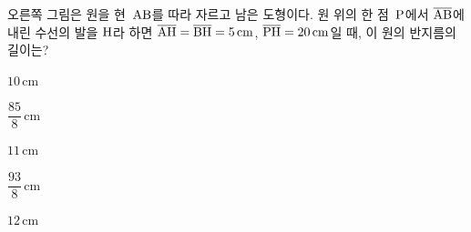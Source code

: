 \noindent\begin{minipage}[t]{0.58\linewidth}\vspace{0pt}\raggedright 오른쪽 그림은 원을 현~$\mathrm{AB}$를 따라 자르고 남은 도형이다. 원 위의 한 점~$\mathrm{P}$에서 $\overline{\mathrm{AB}}$에 내린 수선의 발을 $\mathrm{H}$라 하면 $\overline{\mathrm{AH}}=\overline{\mathrm{BH}}=5\,\mathrm{cm}$, $\overline{\mathrm{PH}}=20\,\mathrm{cm}$일 때, 이 원의 반지름의 길이는?\end{minipage}\hfill\begin{minipage}[t]{0.4\linewidth}\vspace{0pt}\centering \resizebox{\ifdim\width>\linewidth\linewidth\else\width\fi}{!}{}\end{minipage}\par
\begin{choices32}{\rule[-3ex]{0pt}{8ex}$10\,\mathrm{cm}$}{\rule[-3ex]{0pt}{8ex}$\dfrac{85}{8}\,\mathrm{cm}$}{\rule[-3ex]{0pt}{8ex}$11\,\mathrm{cm}$}{\rule[-3ex]{0pt}{8ex}$\dfrac{93}{8}\,\mathrm{cm}$}{\rule[-3ex]{0pt}{8ex}$12\,\mathrm{cm}$}\end{choices32}
